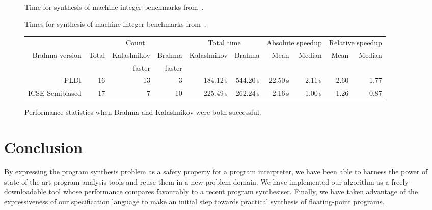 \documentclass[a4paper]{llncs}
\begin{document}
\begin{figure}
\begin{center}
{\tiny

}
\end{center}
\caption{Time for synthesis of machine integer benchmarks from~\cite{brahma}.
 \label{fig:results-table}}
\end{figure}

\begin{figure}
\begin{center}
{\tiny

}
\end{center}
\caption{Times for synthesis of machine integer benchmarks from~\cite{brahma-icse}.}
\label{fig:icse-results-table}
\end{figure}

\begin{figure}
{\tiny
\begin{center}
 \begin{tabular}{r||r|r|r|r|r|r|r|r|r}
  & \multicolumn{3}{c}{Count} & \multicolumn{2}{|c}{Total time} & \multicolumn{2}{|c}{Absolute speedup} & \multicolumn{2}{|c}{Relative speedup} \\
  {\sc Brahma} version & Total & {\sc Kalashnikov} & {\sc Brahma} & {\sc Kalashnikov} & {\sc Brahma} & Mean & Median & Mean & Median \\
  &       & faster            & faster       &                   &              &      &        &      & \\
  \hline
  \hline
  PLDI & 16 & 13 & 3 & 184.12\,s & 544.20\,s & 22.50\,s & 2.11\,s & 2.60 & 1.77 \\
  ICSE Semibiased & 17 & 7 & 10 & 225.49\,s & 262.24\,s & 2.16\,s & -1.00\,s & 1.26 & 0.87
 \end{tabular}
\end{center}
}

 \caption{Performance statistics when {\sc Brahma} and {\sc Kalashnikov} were both successful.
 \label{fig:stats-table}}
\end{figure}


\section{Conclusion}

By expressing the program synthesis problem as a safety property for a
program interpreter, we have been able to harness the power of
state-of-the-art program analysis tools and reuse them in a new problem
domain.  We have implemented our algorithm as a freely downloadable tool
whose performance compares favourably to a recent program synthesiser. 
Finally, we have taken advantage of the expressiveness of our specification
language to make an initial step towards practical synthesis of
floating-point programs.
\end{document}
